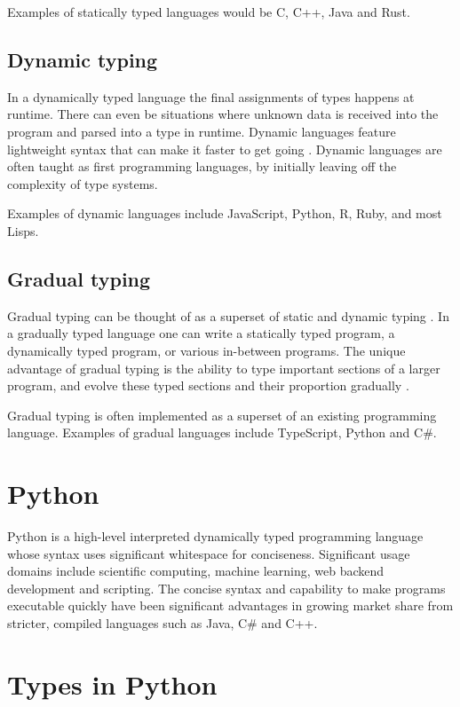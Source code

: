 Examples of statically typed languages would be C, C++, Java and Rust.

\subsection{Dynamic typing}
In a dynamically typed language the final assignments of types happens at runtime. There can even be situations where unknown data is received into the program and parsed into a type in runtime. Dynamic languages feature lightweight syntax that can make it faster to get going \cite{di_grazia_evolution_2022}. Dynamic languages are often taught as first programming languages, by initially leaving off the complexity of type systems.


Examples of dynamic languages include JavaScript, Python, R, Ruby, and most Lisps.

\subsection{Gradual typing}
Gradual typing can be thought of as a superset of static and dynamic typing \cite{siek_refined_gradual_2015}. In a gradually typed language one can write a statically typed program, a dynamically typed program, or various in-between programs. The unique advantage of gradual typing is the ability to type important sections of a larger program, and evolve these typed sections and their proportion gradually \cite{siek_refined_gradual_2015}. 

Gradual typing is often implemented as a superset of an existing programming language. Examples of gradual languages include TypeScript, Python and C\#.


\section{Python}
Python is a high-level interpreted dynamically typed programming language whose syntax uses significant whitespace for conciseness. Significant usage domains include scientific computing, machine learning, web backend development and scripting. The concise syntax and capability to make programs executable quickly have been significant advantages in growing market share from stricter, compiled languages such as Java, C\# and C++.


\section{Types in Python}

